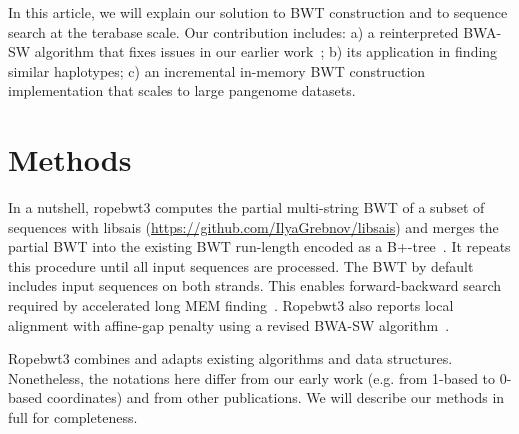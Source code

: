 \documentclass[webpdf,contemporary,large,namedate]{oup-authoring-template}%
\begin{document}
In this article, we will explain our solution to BWT construction
and to sequence search at the terabase scale.
Our contribution includes:
a) a reinterpreted BWA-SW algorithm that fixes issues in our earlier work~\citep{Li:2010fk};
b) its application in finding similar haplotypes;
c) an incremental in-memory BWT construction implementation that scales to large pangenome datasets.

\section{Methods}

In a nutshell, ropebwt3 computes the partial multi-string BWT of a subset of sequences with libsais (\url{https://github.com/IlyaGrebnov/libsais})
and merges the partial BWT into the existing BWT run-length encoded as a B+-tree~\citep{Li:2014ab}.
It repeats this procedure until all input sequences are processed.
The BWT by default includes input sequences on both strands.
This enables forward-backward search~\citep{Li:2012fk} required by accelerated long MEM finding~\citep{DBLP:conf/dlt/Gagie24}.
Ropebwt3 also reports local alignment with affine-gap penalty using a revised BWA-SW algorithm~\citep{Li:2010fk}.

Ropebwt3 combines and adapts existing algorithms and data structures.
Nonetheless, the notations here differ from our early work (e.g. from 1-based to 0-based coordinates) and from other publications.
We will describe our methods in full for completeness.
\end{document}
